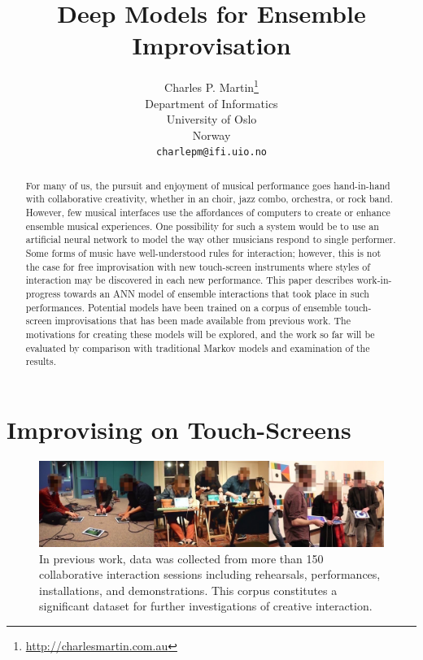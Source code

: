 \documentclass{article}
\title{Deep Models for Ensemble Improvisation}
\author{
  Charles P. Martin\thanks{\url{http://charlesmartin.com.au}}\\
  Department of Informatics\\
  University of Oslo\\
  Norway\\
  \texttt{charlepm@ifi.uio.no}\\
}
\begin{document}
\maketitle

\begin{abstract}
  For many of us, the pursuit and enjoyment of musical performance
  goes hand-in-hand with collaborative creativity, whether in an
  choir, jazz combo, orchestra, or rock band. However, few musical
  interfaces use the affordances of computers to create or enhance 
  ensemble musical experiences.
  One possibility for such a system would be to use an artificial
  neural network to model the way other musicians respond to single
  performer. Some forms of music have well-understood rules for
  interaction; however, this is not the case for free improvisation
  with new touch-screen instruments where styles of interaction may be
  discovered in each new performance.
  This paper describes work-in-progress towards an ANN model of
  ensemble interactions that took place in such performances.
  Potential models have been trained on a corpus of ensemble
  touch-screen improvisations that has been made available from
  previous work. The motivations for creating these models will be
  explored, and the work so far will be evaluated by comparison with
  traditional Markov models and examination of the results.
\end{abstract}

\section{Improvising on Touch-Screens}



\begin{figure}
  \centering
  \includegraphics[width=\textwidth]{three-performance-contexts}
  \caption{In previous work, data was collected from more than 150
    collaborative interaction sessions including rehearsals,
    performances, installations, and demonstrations. This corpus
    constitutes a significant dataset for further investigations of
    creative interaction.}\label{fig:performance-contexts}
\end{figure}
\end{document}

